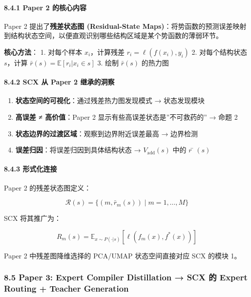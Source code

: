 \documentclass[
  12pt,
]{ctexart}
\providecommand{\tightlist}{%
  \setlength{\itemsep}{0pt}\setlength{\parskip}{0pt}}
\begin{document}
\paragraph{8.4.1 Paper 2
的核心内容}\label{paper-2-ux7684ux6838ux5fc3ux5185ux5bb9}

Paper 2 提出了\textbf{残差状态图 (Residual-State
Maps)}：将势函数的预测误差映射到结构状态空间，以便直观识别哪些结构区域是某个势函数的薄弱环节。

\textbf{核心方法}： 1. 对每个样本 \(x_i\)，计算残差
\(r_i = \ell(f(x_i), y_i)\) 2. 对每个结构状态 \(s\)，计算
\(\bar{r}(s) = \mathbb{E}[r_i | x_i \in s]\) 3. 绘制 \(\bar{r}(s)\)
的热力图

\paragraph{8.4.2 SCX 从 Paper 2
继承的洞察}\label{scx-ux4ece-paper-2-ux7ee7ux627fux7684ux6d1eux5bdf}

\begin{enumerate}
\def\labelenumi{\arabic{enumi}.}
\tightlist
\item
  \textbf{状态空间的可视化}：通过残差热力图发现模式 → 状态发现模块
\item
  \textbf{高误差 ≠ 高价值}：Paper 2 显示有些高误差状态是''不可救药的'' →
  命题 2
\item
  \textbf{状态边界的过渡区域}：观察到边界附近误差最高 → 边界检测
\item
  \textbf{误差归因}：将误差归因到具体结构状态 → \(V_{\text{add}}(s)\)
  中的 \(r̄(s)\)
\end{enumerate}

\paragraph{8.4.3 形式化连接}\label{ux5f62ux5f0fux5316ux8fdeux63a5-1}

Paper 2 的残差状态图定义：

\[
\mathcal{R}(s) = \{(m, \bar{r}_m(s)) \mid m = 1, \dots, M\}
\]

SCX 将其推广为：

\[
R_m(s) = \mathbb{E}_{x \sim P(\cdot|s)}[\ell(f_m(x), f^*(x))]
\]

Paper 2 中残差图降维选择的 PCA/UMAP 状态空间直接对应 SCX 的模块 1。

\subsubsection{8.5 Paper 3: Expert Compiler Distillation → SCX 的 Expert
Routing + Teacher
Generation}\label{paper-3-expert-compiler-distillation-scx-ux7684-expert-routing-teacher-generation}
\end{document}
